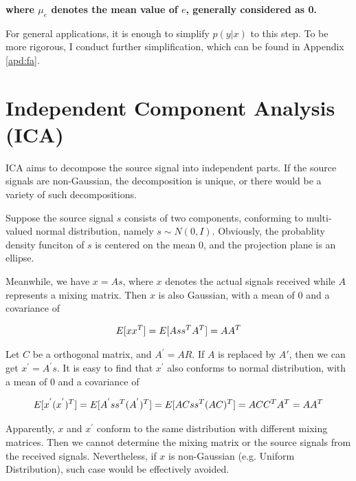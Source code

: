 \documentclass[12pt,a4paper]{article}
\theoremstyle{definition}
\begin{document}
\textbf{where $\mu_{e}$ denotes the mean value of $e$, generally considered as 0.}

\vspace{0.008\linewidth}
For general applications, it is enough to simplify $p(y|x)$ to this step. To be more rigorous, I conduct further simplification, which can be found in Appendix \ref{apd:fa}.

\section{Independent Component Analysis (ICA)}

ICA aims to decompose the source signal into independent parts. If the source signals are non-Gaussian, the decomposition is unique, or there would be a variety of such decompositions.

\vspace{0.008\linewidth}
Suppose the source signal $s$ consists of two components, conforming to multi-valued normal distribution, namely $s \sim N(0,I)$. Obviously, the probablity density funciton of $s$ is centered on the mean 0, and the projection plane is an ellipse.

\vspace{0.008\linewidth}
Meanwhile, we have $x=As$, where $x$ denotes the actual signals received while $A$ represents a mixing matrix. Then $x$ is also Gaussian, with a mean of 0 and a covariance of 

\begin{large}
\begin{align*}
	\centering
	E[xx^{T}] = E[Ass^{T}A^{T}] = AA^{T}
\end{align*}
\end{large}

\vspace{0.008\linewidth}
Let $C$ be a orthogonal matrix, and $A^{'}=AR$. If $A$ is replaced by $A{'}$, then we can get $x^{'}=A^{'}s$. It is easy to find that $x^{'}$ also conforms to normal distribution, with a mean of 0 and a covariance of

\begin{large}
\begin{equation*}
	\centering
	E[x^{'}(x^{'})^{T}]=E[A^{'}ss^{T}(A^{'})^{T}]=E[ACss^{T}(AC)^{T}]=ACC^{T}A^{T}=AA^{T}
\end{equation*}
\end{large}

\vspace{0.008\linewidth}
Apparently, $x$ and $x^{'}$ conform to the same distribution with different mixing matrices. Then we cannot determine the mixing matrix or the source signals from the received signals. Nevertheless, if $x$ is non-Gaussian (e.g. Uniform Distribution), such case would be effectively avoided.
\end{document}

